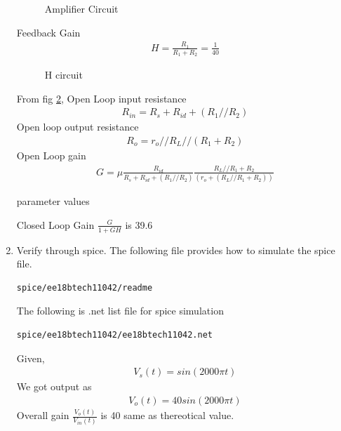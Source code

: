 \begin{enumerate}[label=\thesubsection.\arabic*.,ref=\thesubsection.\theenumi]
\begin{figure}[!h]
		\resizebox{\columnwidth}{!}{}
\caption{Amplifier Circuit}
\label{fig:ee18btech11042_1}
\end{figure}
Feedback Gain
\begin{align}
    H = \frac{R_1}{R_1+R_2} = \frac{1}{40}
    \label{eq:ee18btech11042_6}
\end{align}
\begin{figure}[!h]
		\resizebox{\columnwidth}{!}{}
\caption{H circuit}
\label{fig:ee18btech11042_2}
\end{figure}
From fig \ref{fig:ee18btech11042_2},
Open Loop  input resistance
\begin{align}
    R_{in} = R_s+R_{id}+(R_1//R_2)
    \label{eq:ee18btech11042_7}
\end{align}
Open loop output resistance 
\begin{align}
    R_o = r_o//R_L//(R_1+R_2)
    \label{eq:ee18btech11042_8}
\end{align}
Open Loop gain
\begin{align}
    G = \mu \frac{R_{id}}{R_s+R_{id}+(R_1//R_2)}\frac{R_L//R_1+R_2}{(r_o+(R_L//R_1+R_2))}
    \label{eq:ee18btech11042_9}
\end{align}
\begin{table}[!h]
    \centering
  	\resizebox{\columnwidth}{!}{}
    \caption{parameter values}
    \label{table:ee18btech11042_1}
\end{table}

 Closed Loop Gain   $\frac{G}{1+GH}$  is 39.6


\item Verify through spice.
\newline
The following file provides how to simulate the spice file.
\begin{lstlisting}
spice/ee18btech11042/readme
\end{lstlisting}


 The following is .net list file for spice simulation
 
\begin{lstlisting}
spice/ee18btech11042/ee18btech11042.net
\end{lstlisting}
Given,
\begin{align}
    V_s (t)= sin(2000\pi t)
    \label{eq:ee18btech11042_11}
\end{align}
We got output as
\begin{align}
    V_o(t) = 40 sin(2000\pi t)
    \label{eq:ee18btech11042_12}
\end{align}
Overall gain  $\frac{V_o(t)}{V_{in}(t)}$ is 40 same as thereotical value.
\begin{figure}[!ht]
    

\end{figure}
\end{enumerate}
